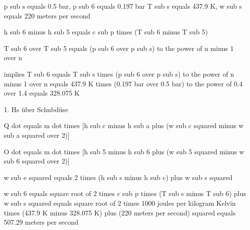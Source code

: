 p sub s equals 0.5 bar, p sub 6 equals 0.197 bar  
T sub s equals 437.9 K, w sub s equals 220 meters per second  

h sub 6 minus h sub 5 equals c sub p times (T sub 6 minus T sub 5)  

T sub 6 over T sub 5 equals (p sub 6 over p sub s) to the power of n minus 1 over n  

implies T sub 6 equals T sub s times (p sub 6 over p sub s) to the power of n minus 1 over n equals 437.9 K times (0.197 bar over 0.5 bar) to the power of 0.4 over 1.4 equals 328.075 K  

1. Hs über Schubdüse  

Q dot equals m dot times [h sub c minus h sub a plus (w sub c squared minus w sub a squared over 2)]  

O dot equals m dot times [h sub 5 minus h sub 6 plus (w sub 5 squared minus w sub 6 squared over 2)]  

w sub e squared equals 2 times (h sub s minus h sub c) plus w sub s squared  

w sub 6 equals square root of 2 times c sub p times (T sub s minus T sub 6) plus w sub s squared equals square root of 2 times 1000 joules per kilogram Kelvin times (437.9 K minus 328.075 K) plus (220 meters per second) squared equals 507.29 meters per second